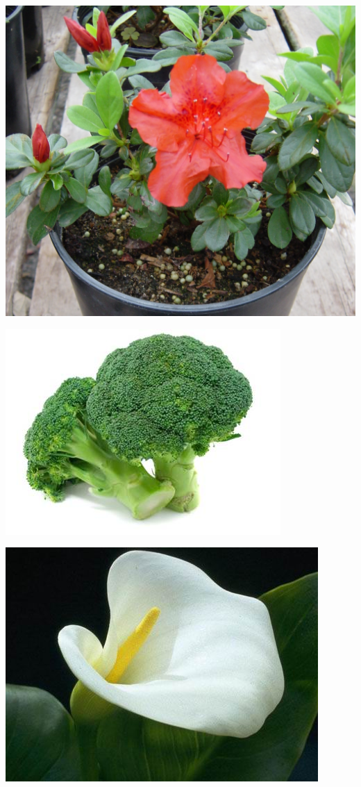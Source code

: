 \documentclass{article}
\begin{document}
\begin{center}
\includegraphics[width=0.9\textheight, angle=90]{../Azalea.jpg}
\end{center}
\newpage

\begin{center}
\includegraphics[width=0.9\textheight, angle=90]{../Broccoli.jpg}
\end{center}
\newpage

\begin{center}
\includegraphics[width=0.9\textheight, angle=90]{../CallaLily.jpg}
\end{center}
\newpage
\end{document}
